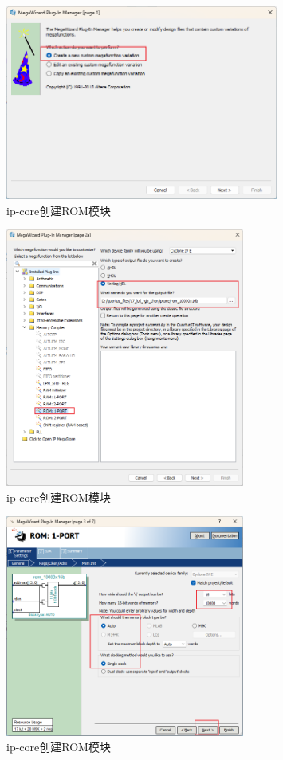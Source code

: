 \documentclass[UTF8]{article}
\theoremstyle{MyLineTheoremStyle} %
\theoremstyle{MyBlockTheoremStyle} %
\theoremstyle{MySubsubsectionStyle} %
\begin{document}
\begin{figure}[H]
    \centering
    \includegraphics[width=0.8\textwidth]{ip-core3.png}
    \caption{ip-core创建ROM模块}
    \label{fig:ip-core创建ROM模块2}
\end{figure}

\begin{figure}[H]
    \centering
    \includegraphics[width=0.7\textwidth]{ip-core4.png}
    \caption{ip-core创建ROM模块}
    \label{fig:ip-core创建ROM模块3}
\end{figure}

\begin{figure}[H]
    \centering
    \includegraphics[width=0.7\textwidth]{ip-core5.png}
    \caption{ip-core创建ROM模块}
    \label{fig:ip-core创建ROM模块4}
\end{figure}
\end{document}
